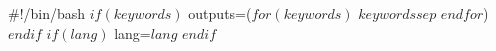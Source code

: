 #!/bin/bash
$if(keywords)$
outputs=($for(keywords)$
$keywords$$sep$ 
$endfor$)
$endif$
$if(lang)$
lang=$lang$
$endif$